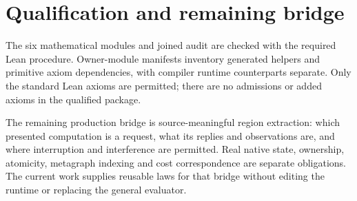 \documentclass[11pt,a4paper]{article}
\begin{document}
\section{Qualification and remaining bridge}

The six mathematical modules and joined audit are checked with the required
Lean procedure. Owner-module manifests inventory generated helpers and
primitive axiom dependencies, with compiler runtime counterparts separate.
Only the standard Lean axioms are permitted; there are no admissions or added
axioms in the qualified package.

The remaining production bridge is source-meaningful region extraction:
which presented computation is a request, what its replies and observations
are, and where interruption and interference are permitted. Real native
state, ownership, atomicity, metagraph indexing and cost correspondence are
separate obligations. The current work supplies reusable laws for that
bridge without editing the runtime or replacing the general evaluator.
\end{document}
